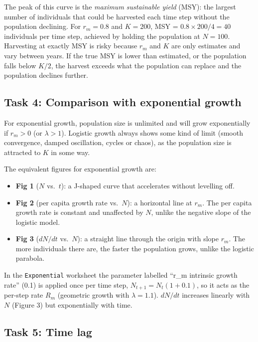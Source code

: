 \documentclass[
  a4paper]{book}
\providecommand{\tightlist}{%
  \setlength{\itemsep}{0pt}\setlength{\parskip}{0pt}}
\begin{document}
The peak of this curve is the \emph{maximum sustainable yield} (MSY): the largest number of individuals that could be harvested each time step without the population declining. For \(r_m = 0.8\) and \(K = 200\), MSY = \(0.8 \times 200/4 = 40\) individuals per time step, achieved by holding the population at \(N = 100\). Harvesting at exactly MSY is risky because \(r_m\) and \(K\) are only estimates and vary between years. If the true MSY is lower than estimated, or the population falls below \(K/2\), the harvest exceeds what the population can replace and the population declines further.

\subsection{Task 4: Comparison with exponential growth}\label{task-4-comparison-with-exponential-growth}

For exponential growth, population size is unlimited and will grow exponentially if \(r_m > 0\) (or \(\lambda > 1\)). Logistic growth always shows some kind of limit (smooth convergence, damped oscillation, cycles or chaos), as the population size is attracted to \(K\) in some way.

The equivalent figures for exponential growth are:

\begin{itemize}
\tightlist
\item
  \textbf{Fig 1} (\(N\) vs.~\(t\)): a J-shaped curve that accelerates without levelling off.
\item
  \textbf{Fig 2} (per capita growth rate vs.~\(N\)): a horizontal line at \(r_m\). The per capita growth rate is constant and unaffected by \(N\), unlike the negative slope of the logistic model.
\item
  \textbf{Fig 3} (\(dN/dt\) vs.~\(N\)): a straight line through the origin with slope \(r_m\). The more individuals there are, the faster the population grows, unlike the logistic parabola.
\end{itemize}

In the \texttt{Exponential} worksheet the parameter labelled ``r\_m intrinsic growth rate'' (0.1) is applied once per time step, \(N_{t+1} = N_t(1 + 0.1)\), so it acts as the per-step rate \(R_m\) (geometric growth with \(\lambda = 1.1\)). \(dN/dt\) increases linearly with \(N\) (Figure 3) but exponentially with time.

\subsection{Task 5: Time lag}\label{task-5-time-lag}
\end{document}
